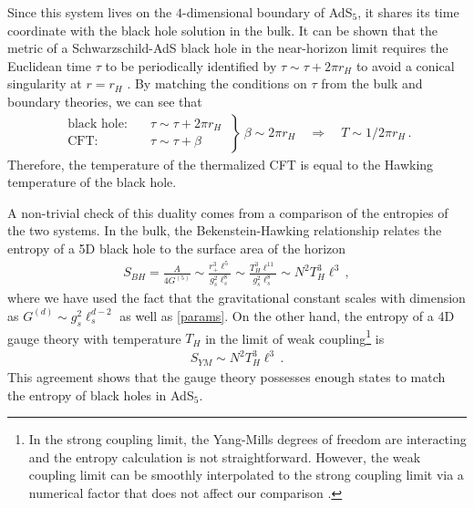 \documentclass[../PhD.tex]{subfiles}
\begin{document}
Since this system lives on the $4$-dimensional boundary of AdS$_{5}$, it shares its time coordinate with the black hole solution in the bulk. It can be shown that the metric of a Schwarzschild-AdS black hole in the near-horizon limit requires the Euclidean time $\tau$ to be periodically identified by $\tau \sim \tau + 2\pi r_H$ to avoid a conical singularity at $r=r_H$ \cite{1401.1504}. By matching the conditions on $\tau$ from the bulk and boundary theories, we can see that 
\begin{align}
\label{temp/grav}
\left. \begin{aligned}
	\text{black hole:} &\quad \tau \sim \tau + 2\pi r_H \\
	\text{CFT:} &\quad \tau \sim \tau + \beta
	\end{aligned}
\: \right\} \: \beta \sim 2\pi r_H \quad \Rightarrow \quad T \sim 1/ 2\pi r_H \, .
\end{align}
Therefore, the temperature of the thermalized CFT is equal to the Hawking temperature of the black hole.

A non-trivial check of this duality comes from a comparison of the entropies of the two systems. In the bulk, the Bekenstein-Hawking relationship relates the entropy of a 5D black hole to the surface area of the horizon \cite{Bekenstein:1973ur}
\begin{align}
\label{bh dual entropy}
S_{BH} = \frac{A}{4G^{(5)}} \sim \frac{r_+^3 \ell^5}{g_s^2 \ell_s^8} \sim \frac{T_H^3 \ell^{11}}{g_s^2 \ell_s^8} \sim N^2 T_H^3 \ell^3 \, ,
\end{align}
where we have used the fact that the gravitational constant scales with dimension as $G^{(d)} \sim g_s^2 \ell_s^{d-2}$ as well as \eqref{params}. On the other hand, the entropy of a 4D gauge theory with temperature $T_H$ in the limit of weak coupling\footnote{In the strong coupling limit, the Yang-Mills degrees of freedom are interacting and the entropy calculation is not straightforward. However, the weak coupling limit can be smoothly interpolated to the strong coupling limit via a numerical factor that does not affect our comparison \cite{gr-qc/0602037}.} is
\begin{align}
\label{gauge dual entropy}
S_{YM} \sim N^2 T_H^3 \ell^3 \, .
\end{align}
This agreement shows that the gauge theory possesses enough states to match the entropy of black holes in AdS$_5$.

\end{document}
